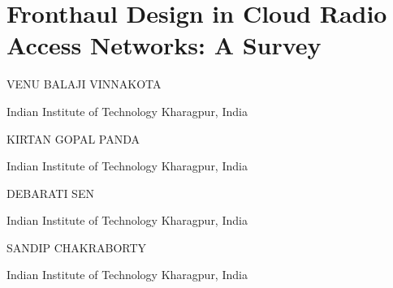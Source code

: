 \chapter{Fronthaul Design in Cloud Radio Access Networks: A Survey}

\begin{center}
{\large\uppercase{Venu Balaji Vinnakota}} 

\vskip -6pt

Indian Institute of Technology Kharagpur, India\\ 
\end{center}


\begin{center}
{\large\uppercase{Kirtan Gopal Panda}} 

\vskip -6pt

Indian Institute of Technology Kharagpur, India\\ 
\end{center}

\begin{center}
{\large\uppercase{Debarati Sen}} 

\vskip -6pt

Indian Institute of Technology Kharagpur, India\\ 
\end{center}

\begin{center}
{\large\uppercase{Sandip chakraborty}} 

\vskip -6pt

Indian Institute of Technology Kharagpur, India\\ 
\end{center}

\vfill

\newpage

